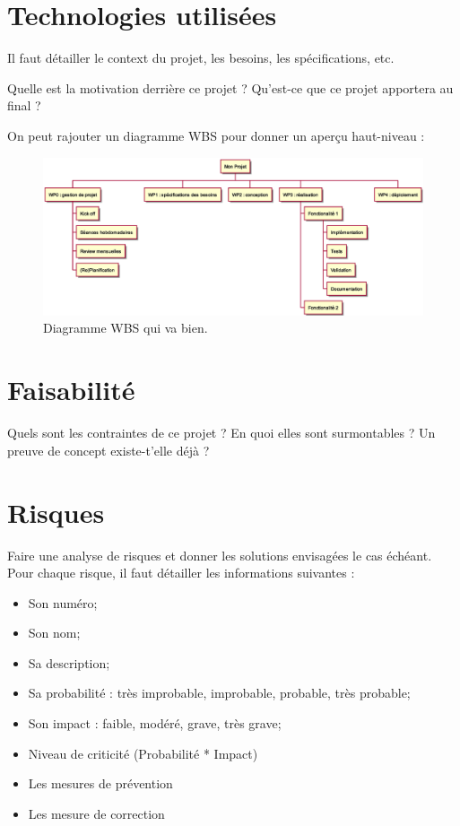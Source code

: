 \section{Technologies utilisées}

Il faut détailler le context du projet, les besoins, les spécifications, etc.

Quelle est la motivation derrière ce projet ? Qu'est-ce que ce projet apportera au final ?

On peut rajouter un diagramme WBS pour donner un aperçu haut-niveau :
\begin{figure}[h]
    \centering
    \includegraphics[width=\textwidth]{./images/WBS_Exemple.eps}
    \caption{Diagramme WBS qui va bien.}
\end{figure}

\section{Faisabilité}
Quels sont les contraintes de ce projet ? En quoi elles sont surmontables ? Un preuve de concept existe-t'elle déjà ?

\section{Risques}
Faire une analyse de risques et donner les solutions envisagées le cas échéant.
Pour chaque risque, il faut détailler les informations suivantes :
\begin{itemize}
  \item Son numéro;
  \item Son nom;
  \item Sa description;
  \item Sa probabilité : très improbable, improbable, probable, très probable;
  \item Son impact :  faible, modéré, grave, très grave;
  \item Niveau de criticité (Probabilité * Impact)
  \item Les mesures de prévention
  \item Les mesure de correction
\end{itemize}

